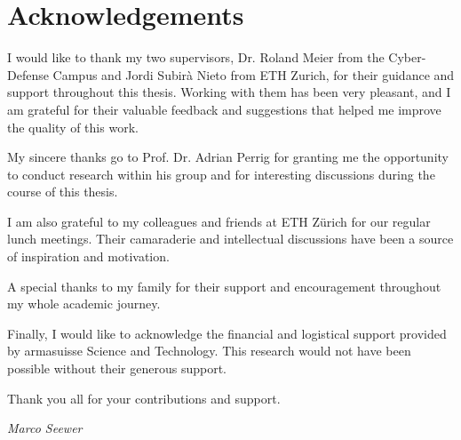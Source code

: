 \chapter*{Acknowledgements}


I would like to thank my two supervisors, Dr. Roland Meier from the Cyber-Defense Campus and Jordi Subirà Nieto from ETH Zurich, for their guidance and support throughout this thesis.
Working with them has been very pleasant, and I am grateful for their valuable feedback and suggestions that helped me improve the quality of this work.


My sincere thanks go to Prof. Dr. Adrian Perrig for granting me the opportunity to conduct research within his group and for interesting discussions during the course of this thesis.

I am also grateful to my colleagues and friends at ETH Zürich for our regular lunch meetings.
Their camaraderie and intellectual discussions have been a source of inspiration and motivation.

A special thanks to my family for their support and encouragement throughout my whole academic journey.

Finally, I would like to acknowledge the financial and logistical support provided by armasuisse Science and Technology.
This research would not have been possible without their generous support.

Thank you all for your contributions and support.

\begin{flushright}
\textit{Marco Seewer}
\end{flushright}
